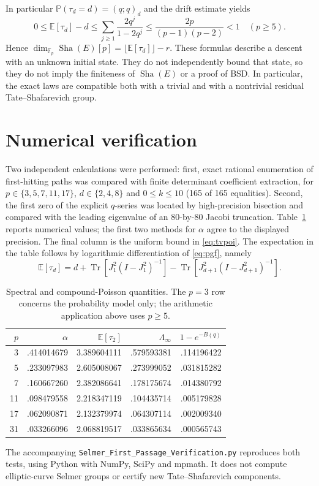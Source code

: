 \documentclass[11pt]{article}
\theoremstyle{definition}\newtheorem{definition}[theorem]{Definition}
\newcommand{\Prob}{\mathbb P}
\newcommand{\Exp}{\mathbb E}
\newcommand{\tr}{\operatorname{Tr}}
\newcommand{\Sha}{\mathop{\mathrm{Sha}}}
\newcommand{\F}{\mathbb F}
\begin{document}
In particular $\Prob(\tau_d=d)=(q;q)_d$ and the drift estimate yields
\[
 0\leq\Exp[\tau_d]-d\leq\sum_{j\geq1}\frac{2q^j}{1-2q^j}
 \leq\frac{2p}{(p-1)(p-2)}<1 \quad(p\geq5).
\]
Hence $\dim_{\F_p}\Sha(E)[p]=\lfloor\Exp[\tau_d]\rfloor-r$. These formulas describe a descent with an unknown initial state. They do not independently bound that state, so they do not imply the finiteness of $\Sha(E)$ or a proof of BSD. In particular, the exact laws are compatible both with a trivial and with a nontrivial residual Tate--Shafarevich group.

\section{Numerical verification}
Two independent calculations were performed: first, exact rational enumeration of first-hitting paths was compared with finite determinant coefficient extraction, for $p\in\{3,5,7,11,17\}$, $d\in\{2,4,8\}$ and $0\leq k\leq10$ (165 of 165 equalities). Second, the first zero of the explicit $q$-series was located by high-precision bisection and compared with the leading eigenvalue of an 80-by-80 Jacobi truncation. Table~\ref{tab:nums} reports numerical values; the first two methods for $\alpha$ agree to the displayed precision. The final column is the uniform bound in \eqref{eq:tvpoi}. The expectation in the table follows by logarithmic differentiation of \eqref{eq:pgf}, namely
\[
 \Exp[\tau_d]=d+\tr[J_1^2(I-J_1^2)^{-1}]-\tr[J_{d+1}^2(I-J_{d+1}^2)^{-1}].
\]
\begin{table}[ht]
\centering
\begin{tabular}{rrrrr}
\toprule
$p$ & $\alpha$ & $\Exp[\tau_2]$ & $\Lambda_\infty$ & $1-e^{-B(q)}$\\
\midrule
3 & .414014679 & 3.389604111 & .579593381 & .114196422\\
5 & .233097983 & 2.605008067 & .273999052 & .031815282\\
7 & .160667260 & 2.382086641 & .178175674 & .014380792\\
11 & .098479558 & 2.218347119 & .104435714 & .005179828\\
17 & .062090871 & 2.132379974 & .064307114 & .002009340\\
31 & .033266096 & 2.068819517 & .033865634 & .000565743\\
\bottomrule
\end{tabular}
\caption{Spectral and compound-Poisson quantities. The $p=3$ row concerns the probability model only; the arithmetic application above uses $p\geq5$.}\label{tab:nums}
\end{table}
The accompanying \texttt{Selmer\_First\_Passage\_Verification.py} reproduces both tests, using Python with NumPy, SciPy and mpmath. It does not compute elliptic-curve Selmer groups or certify new Tate--Shafarevich components.
\end{document}
